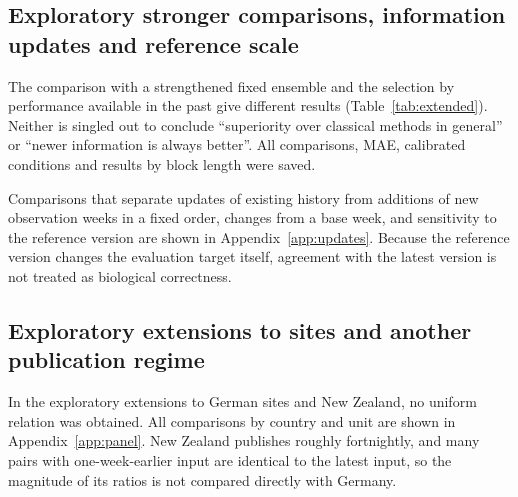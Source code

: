 \documentclass[11pt]{article}
\newcommand{\gentable}[1]{\adjustbox{max width=\linewidth}{}}
\begin{document}
\begin{table}[tbp]\centering\small
\caption{Point-forecast error and intervals for the main one-week-earlier input and the latest reference, aligned on the same targets. Interval widths are on the common-log concentration scale. Because each model is evaluated only after its publication, this is not a direct comparison between models.}\label{tab:auxiliary}
\gentable{tab_auxiliary}
\end{table}

\subsection{Exploratory stronger comparisons, information updates and reference scale}

\begin{table}[tbp]\centering\small
\caption{Exploratory stronger classical references with the latest input (German national analysis). The columns give WIS ratios [95\% intervals] for candidates with the latest input and with inputs from one and two weeks earlier. The original manuscript tabulated only the one-week-earlier column and showed the other two only in a figure; they are taken here from the same analysis output.}\label{tab:extended}
\gentable{tab_extended}
\end{table}

The comparison with a strengthened fixed ensemble and the selection by performance available in the past give different results (Table~\ref{tab:extended}). Neither is singled out to conclude ``superiority over classical methods in general'' or ``newer information is always better''. All comparisons, MAE, calibrated conditions and results by block length were saved.

Comparisons that separate updates of existing history from additions of new observation weeks in a fixed order, changes from a base week, and sensitivity to the reference version are shown in Appendix~\ref{app:updates}. Because the reference version changes the evaluation target itself, agreement with the latest version is not treated as biological correctness.

\subsection{Exploratory extensions to sites and another publication regime}\label{sec:explore}

In the exploratory extensions to German sites and New Zealand, no uniform relation was obtained. All comparisons by country and unit are shown in Appendix~\ref{app:panel}. New Zealand publishes roughly fortnightly, and many pairs with one-week-earlier input are identical to the latest input, so the magnitude of its ratios is not compared directly with Germany.
\end{document}
